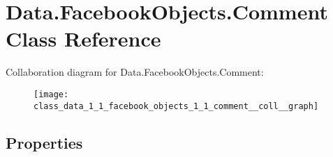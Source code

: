 \hypertarget{class_data_1_1_facebook_objects_1_1_comment}{}\section{Data.\+Facebook\+Objects.\+Comment Class Reference}
\label{class_data_1_1_facebook_objects_1_1_comment}


Collaboration diagram for Data.\+Facebook\+Objects.\+Comment\+:
\nopagebreak
\begin{figure}[H]
\begin{center}
\leavevmode
\texttt{[image: class\_data\_1\_1\_facebook\_objects\_1\_1\_comment\_\_coll\_\_graph]}
\end{center}
\end{figure}
\subsection*{Properties}
